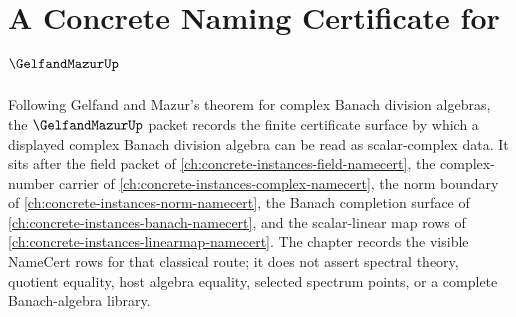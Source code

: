 \chapter{A Concrete Naming Certificate for $\GelfandMazurUp$}
\label{ch:concrete-instances-gelfand-mazur-namecert}

Following Gelfand and Mazur's theorem for complex Banach division algebras, the $\GelfandMazurUp$ packet records the finite certificate surface by which a displayed complex Banach division algebra can be read as scalar-complex data. It sits after the field packet of \autoref{ch:concrete-instances-field-namecert}, the complex-number carrier of \autoref{ch:concrete-instances-complex-namecert}, the norm boundary of \autoref{ch:concrete-instances-norm-namecert}, the Banach completion surface of \autoref{ch:concrete-instances-banach-namecert}, and the scalar-linear map rows of \autoref{ch:concrete-instances-linearmap-namecert}. The chapter records the visible NameCert rows for that classical route; it does not assert spectral theory, quotient equality, host algebra equality, selected spectrum points, or a complete Banach-algebra library.


